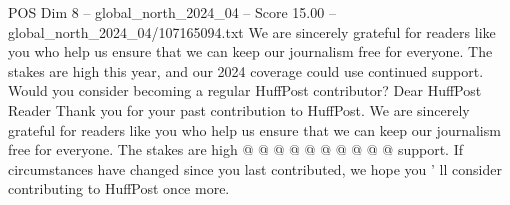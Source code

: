 \begin{textsample}{POS Dim 8 – global\_north\_2024\_04 – Score 15.00 – global\_north\_2024\_04/107165094.txt}
We are sincerely grateful for readers like you who help us ensure that we can keep our journalism free for everyone.
The stakes are high this year, and our 2024 coverage could use continued support.
Would you consider becoming a regular HuffPost contributor?
Dear HuffPost Reader Thank you for your past contribution to HuffPost.
We are sincerely grateful for readers like you who help us ensure that we can keep our journalism free for everyone.
The stakes are high @ @ @ @ @ @ @ @ @ @ support.
If circumstances have changed since you last contributed, we hope you ' ll consider contributing to HuffPost once more.

\end{textsample}
